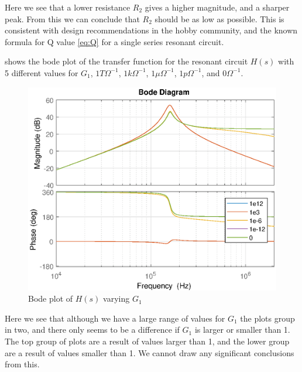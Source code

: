 Here we see that a lower resistance $R_2$ gives a higher magnitude, and a sharper peak. From this we can conclude that $R_2$ should be as low as possible. This is consistent with design recommendations in the hobby community, and the known formula for Q value \cref{eq:Q} for a single series resonant circuit.

\newpage
{} shows the bode plot of the transfer function for the resonant circuit $H(s)$ with 5 different values for $G_1$, $1T{\Omega}^{-1}$, $1k{\Omega}^{-1}$, $1\mu{\Omega}^{-1}$, $1p{\Omega}^{-1}$, and $0{\Omega}^{-1}$.

\begin{figure}[H]
    \centering
    \includegraphics[width=\textwidth]{img/CoilRigBode_G1.eps}
    \caption{Bode plot of $H(s)$ varying $G_1$}
    \label{fig:bode_g1}
\end{figure}

Here we see that although we have a large range of values for $G_1$ the plots group in two, and there only seems to be a difference if $G_1$ is larger or smaller than 1. The top group of plots are a result of values larger than 1, and the lower group are a result of values smaller than 1. We cannot draw any significant conclusions from this.

